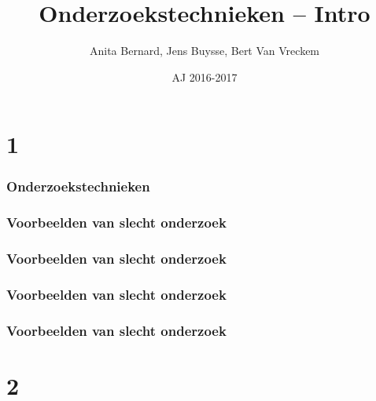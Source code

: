 \documentclass{beamer}
\title[Intro]{Onderzoekstechnieken -- Intro}
\author{Anita Bernard, Jens Buysse, Bert {Van Vreckem}}
\date{AJ 2016-2017}
\begin{document}

\HoGentLogo

\titleframe


\section{1}


\begin{frame}
  \frametitle{Onderzoekstechnieken}

\end{frame}

\begin{frame}
  \frametitle{Voorbeelden van slecht onderzoek}

\end{frame}

\begin{frame}
  \frametitle{Voorbeelden van slecht onderzoek}

\end{frame}

\begin{frame}
  \frametitle{Voorbeelden van slecht onderzoek}

\end{frame}

\begin{frame}
  \frametitle{Voorbeelden van slecht onderzoek}

\end{frame}

\section{2}
\end{document}
